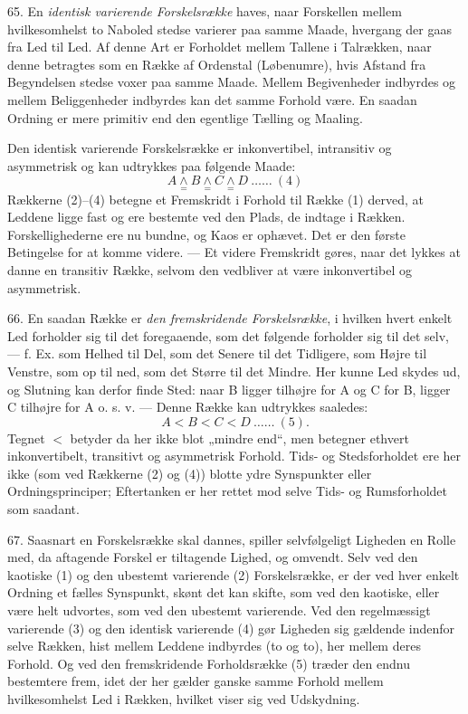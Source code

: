 \documentclass[12pt,a4paper]{book}
\newcommand{\opage}[1]{\marginnote{\footnotesize\textit{[#1]}}}
\begin{document}
65. En \emph{identisk varierende Forskelsrække} haves, naar Forskellen mellem
hvilkesomhelst to Naboled stedse varierer paa samme Maade, hvergang der gaas
fra Led til Led. Af denne Art er Forholdet mellem Tallene i Talrækken, naar
denne betragtes som en Række af Ordenstal (Løbenumre), hvis Afstand fra
Begyndelsen stedse voxer paa samme Maade. Mellem Begivenheder indbyrdes og
mellem Beliggenheder indbyrdes kan det samme Forhold være. En saadan Ordning er
mere primitiv end den egentlige Tælling og Maaling.

Den identisk varierende Forskelsrække er inkonvertibel, intransitiv og
asymmetrisk og kan udtrykkes paa følgende Maade:
\[ A \underset{=}{\wedge} B \underset{=}{\wedge} C \underset{=}{\wedge} D \ \ldots\ldots\ (4) \]
Rækkerne (2)--(4) betegne et Fremskridt i Forhold til Række (1) derved, at
Leddene ligge fast og ere bestemte ved den Plads, de indtage i Rækken.
Forskellighederne ere nu bundne, og Kaos er ophævet. Det er den første
Betingelse for at komme videre. --- Et videre Fremskridt gøres, naar det lykkes
at danne en transitiv Række, selvom den vedbliver at være inkonvertibel og
asymmetrisk.

66. En saadan Række er \emph{den fremskridende Forskelsrække}, i hvilken hvert
enkelt Led forholder sig til det foregaaende, som det følgende forholder sig
til det selv, --- f. Ex. som Helhed til Del, som det Senere til det Tidligere,
som Højre til Venstre, som op til ned, som det Større til det Mindre. Her kunne
Led skydes ud, og Slutning kan derfor finde Sted: naar B ligger tilhøjre for A
og C for B, ligger C tilhøjre for A o. s. v. --- Denne Række kan udtrykkes
saaledes:
\[ A < B < C < D \ \ldots\ldots\ (5). \]
Tegnet $<$ betyder da her ikke blot „mindre end“, men betegner ethvert
inkonvertibelt, transitivt og asymmetrisk Forhold.
\opage{168}Tids- og Stedsforholdet ere her ikke (som ved Rækkerne (2) og (4)) blotte ydre
Synspunkter eller Ordningsprinciper; Eftertanken er her rettet mod selve Tids-
og Rumsforholdet som saadant.

67. Saasnart en Forskelsrække skal dannes, spiller selvfølgeligt Ligheden en
Rolle med, da aftagende Forskel er tiltagende Lighed, og omvendt. Selv ved den
kaotiske (1) og den ubestemt varierende (2) Forskelsrække, er der ved hver
enkelt Ordning et fælles Synspunkt, skønt det kan skifte, som ved den kaotiske,
eller være helt udvortes, som ved den ubestemt varierende. Ved den
regelmæssigt varierende (3) og den identisk varierende (4) gør Ligheden sig
gældende indenfor selve Rækken, hist mellem Leddene indbyrdes (to og to), her
mellem deres Forhold. Og ved den fremskridende Forholdsrække (5) træder den
endnu bestemtere frem, idet der her gælder ganske samme Forhold mellem
hvilkesomhelst Led i Rækken, hvilket viser sig ved Udskydning.
\end{document}
